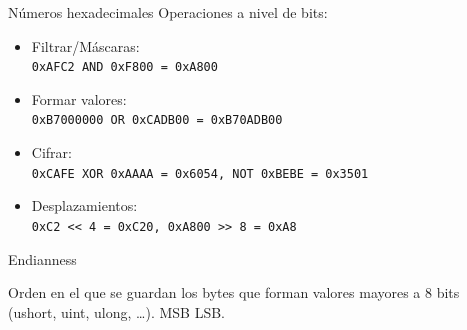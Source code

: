 \begin{frame}{Números hexadecimales}
    Operaciones a nivel de bits:
    \small
    \begin{itemize}
        \item<3-> Filtrar/Máscaras:\\\texttt{0xAFC2 AND 0xF800 = 0xA800}
        \item<4-> Formar valores:\\\texttt{0xB7000000 OR 0xCADB00 = 0xB70ADB00}
        \item<5-> Cifrar:\\\texttt{0xCAFE XOR 0xAAAA = 0x6054, NOT 0xBEBE = 0x3501}
        \item<6-> Desplazamientos:\\\texttt{0xC2 << 4 = 0xC20, 0xA800 >> 8 = 0xA8}
    \end{itemize}
\end{frame}


\begin{frame}{Endianness}
    \begin{block}{}
        Orden en el que se guardan los bytes que forman valores mayores a 8 bits (ushort, uint, ulong, \ldots). MSB \textrightarrow LSB.
    \end{block}
    \centering{}
    \vfill
\end{frame}

